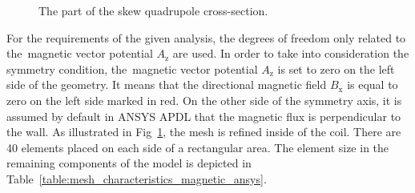 \begin{figure}[H]
    \centering
    \caption{The  part of the skew quadrupole cross-section.}
    \label{fig:skew_quad_magnetic_mesh_ansys}
\end{figure}

For the requirements of the given analysis, the degrees of freedom only related to the~magnetic vector potential $A_\text{z}$ are used. In order to take into consideration the symmetry condition, the~magnetic vector potential $A_\text{z}$ is set to zero on the left side of the geometry. It means that the directional magnetic field $B_\text{x}$ is equal to zero on the left side marked in red. On the other side of the symmetry axis, it is assumed by default in ANSYS APDL that the magnetic flux is perpendicular to the wall. As illustrated in Fig~\ref{fig:skew_quad_magnetic_mesh_ansys}, the mesh is refined inside of the coil. There are 40 elements placed on each side of a rectangular area. The element size in the remaining components of the model is depicted in Table~\ref{table:mesh_characteristics_magnetic_ansys}.


